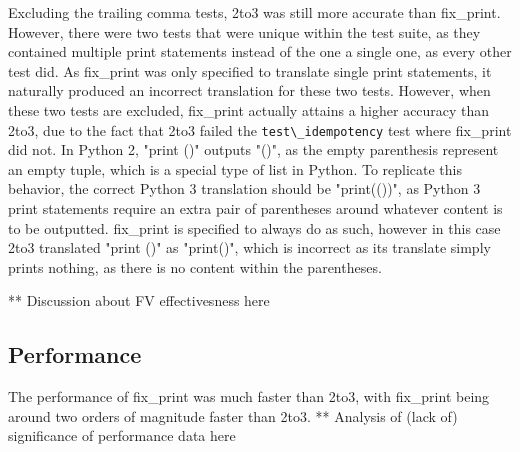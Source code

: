 Excluding the trailing comma tests, 2to3 was still more accurate than fix\_print. However, there were two tests that were unique within the test suite, as they contained multiple print statements instead of the one a single one, as every other test did. As fix\_print was only specified to translate single print statements, it naturally produced an incorrect translation for these two tests. However, when these two tests are excluded, fix\_print actually attains a higher accuracy than 2to3, due to the fact that 2to3 failed the \verb|test\_idempotency| test where fix\_print did not. In Python 2, "print ()" outputs "()", as the empty parenthesis represent an empty tuple, which is a special type of list in Python. To replicate this behavior, the correct Python 3 translation should be "print(())", as Python 3 print statements require an extra pair of parentheses around whatever content is to be outputted. fix\_print is specified to always do as such, however in this case 2to3 translated "print ()" as "print()", which is incorrect as its translate simply prints nothing, as there is no content within the parentheses.

** Discussion about FV effectivesness here

\subsection{Performance}

The performance of fix\_print was much faster than 2to3, with fix\_print being around two orders of magnitude faster than 2to3.
** Analysis of (lack of) significance of performance data here